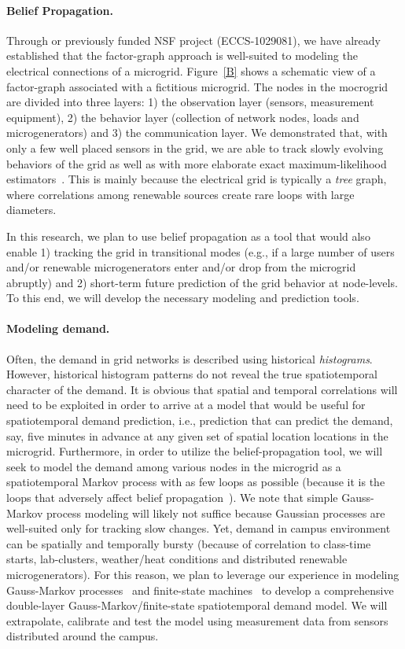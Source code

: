 \paragraph{Belief Propagation.} Through or previously funded NSF project
(ECCS-1029081), we have already established that the factor-graph approach
is well-suited to modeling the electrical connections of a microgrid.
Figure~\ref{B} shows a schematic view of a factor-graph associated with a
fictitious microgrid. The nodes in the mocrogrid are divided into three
layers: 1) the observation layer (sensors, measurement equipment), 2) the
behavior layer (collection of network nodes, loads and microgenerators) and
3) the communication layer. We demonstrated that, with only a few well
placed sensors in the grid, we are able to track slowly evolving behaviors
of the grid as well as with more elaborate exact maximum-likelihood
estimators~\cite{Hu10,Hu11,Hu11a}. This is mainly because the electrical
grid is typically a {\em tree} graph, where correlations among renewable
sources create rare loops with large diameters.

In this research, we plan to use belief propagation as a tool that would
also enable 1) tracking the grid in transitional modes (e.g., if a large
number of users and/or renewable microgenerators enter and/or drop from the
microgrid abruptly) and 2) short-term future prediction of the grid
behavior at node-levels.  To this end, we will develop the necessary
modeling and prediction tools.

\paragraph{Modeling demand.} Often, the demand in grid networks is
described using historical {\em histograms}. However, historical histogram
patterns do not reveal the true spatiotemporal character of the demand. It
is obvious that spatial and temporal correlations will need to be exploited
in order to arrive at a model that would be useful for spatiotemporal
demand prediction, i.e., prediction that can predict the demand, say, five
minutes in advance at any given set of spatial location locations in the
microgrid.  Furthermore, in order to utilize the belief-propagation tool,
we will seek to model the demand among various nodes in the microgrid as a
spatiotemporal Markov process with as few loops as possible (because it is
the loops that adversely affect belief
propagation~\cite{Wiberg95,Kschischang01,Loeliger07}). We note that simple
Gauss-Markov process modeling will likely not suffice because Gaussian
processes are well-suited only for tracking slow changes.  Yet, demand in
campus environment can be spatially and temporally bursty (because of
correlation to class-time starts, lab-clusters, weather/heat conditions and
distributed renewable microgenerators).  For this reason, we plan to leverage
our experience in modeling Gauss-Markov processes~\cite{Kavcic00a} and
finite-state machines~\cite{Yang05,Vontobel08} to develop a comprehensive
double-layer Gauss-Markov/finite-state spatiotemporal demand model.  We
will extrapolate, calibrate and test the model using measurement data from
sensors distributed around the campus.

